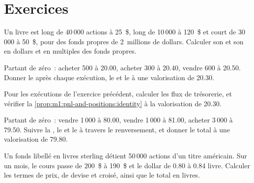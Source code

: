 \section{Exercices}

\begin{exercise}[$\star$]\label{exo:m1:pnl-and-positions:1}
Un livre est long de 40\,000 actions à 25~\$, long de 10\,000 à 120~\$ et court de
30\,000 à 50~\$, pour des fonds propres de 2~millions de dollars. Calculer son  et son  en
dollars et en multiples des fonds propres.
\end{exercise}

\begin{exercise}[$\star$]\label{exo:m1:pnl-and-positions:2}
Partant de zéro~: acheter 500 à 20.00, acheter 300 à 20.40, vendre 600 à 20.50. Donner
le  après chaque exécution, le  et le 
à une valorisation de 20.30.
\end{exercise}

\begin{exercise}[$\star$]\label{exo:m1:pnl-and-positions:3}
Pour les exécutions de l'exercice précédent, calculer les flux de trésorerie, et vérifier
la \cref{prop:m1:pnl-and-positions:identity} à la valorisation de 20.30.
\end{exercise}

\begin{exercise}[$\star\star$]\label{exo:m1:pnl-and-positions:4}
Partant de zéro~: vendre 1\,000 à 80.00, vendre 1\,000 à 81.00, acheter 3\,000 à
79.50. Suivre la , le  et le  à travers le
renversement, et donner le total à une valorisation de 79.80.
\end{exercise}

\begin{exercise}[$\star\star$]\label{exo:m1:pnl-and-positions:5}
Un fonds libellé en livres sterling détient 50\,000 actions d'un titre américain. Sur un mois, le cours
passe de 200~\$ à 190~\$ et le dollar de 0.80 à 0.84 livre.
Calculer les termes de prix, de devise et croisé, ainsi que le total en livres.
\end{exercise}

